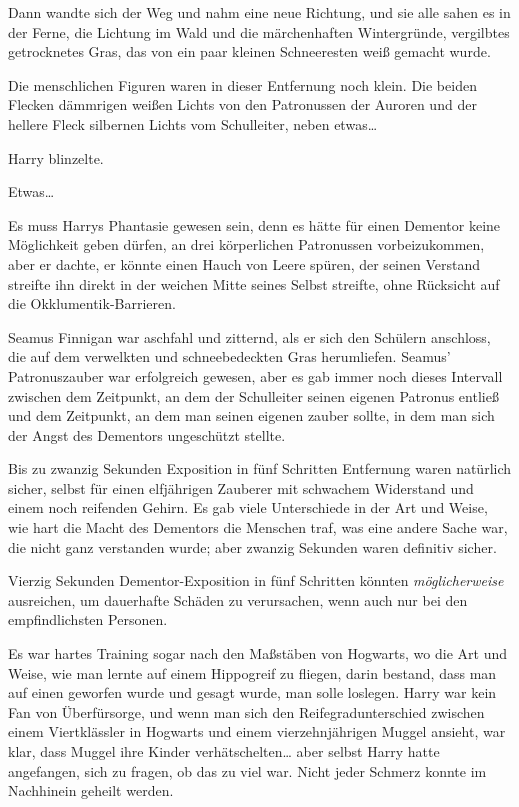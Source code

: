 {Dann wandte sich der Weg und nahm eine neue Richtung, und sie alle sahen es in der Ferne, die Lichtung im Wald und die märchenhaften Wintergründe, vergilbtes getrocknetes Gras, das von ein paar kleinen Schneeresten weiß gemacht wurde.

Die menschlichen Figuren waren in dieser Entfernung noch klein. Die beiden Flecken dämmrigen weißen Lichts von den Patronussen der Auroren und der hellere Fleck silbernen Lichts vom Schulleiter, neben etwas…

Harry blinzelte.

Etwas…

Es muss Harrys Phantasie gewesen sein, denn es hätte für einen Dementor keine Möglichkeit geben dürfen, an drei körperlichen Patronussen vorbeizukommen, aber er dachte, er könnte einen Hauch von Leere spüren, der seinen Verstand streifte ihn direkt in der weichen Mitte seines Selbst streifte, ohne Rücksicht auf die Okklumentik-Barrieren.

Seamus Finnigan war aschfahl und zitternd, als er sich den Schülern anschloss, die auf dem verwelkten und schneebedeckten Gras herumliefen. Seamus' Patronuszauber war erfolgreich gewesen, aber es gab immer noch dieses Intervall zwischen dem Zeitpunkt, an dem der Schulleiter seinen eigenen Patronus entließ und dem Zeitpunkt, an dem man seinen eigenen zauber sollte, in dem man sich der Angst des Dementors ungeschützt stellte.

Bis zu zwanzig Sekunden Exposition in fünf Schritten Entfernung waren natürlich sicher, selbst für einen elfjährigen Zauberer mit schwachem Widerstand und einem noch reifenden Gehirn. Es gab viele Unterschiede in der Art und Weise, wie hart die Macht des Dementors die Menschen traf, was eine andere Sache war, die nicht ganz verstanden wurde; aber zwanzig Sekunden waren definitiv sicher.

Vierzig Sekunden Dementor-Exposition in fünf Schritten könnten \emph{möglicherweise} ausreichen, um dauerhafte Schäden zu verursachen, wenn auch nur bei den empfindlichsten Personen.

Es war hartes Training sogar nach den Maßstäben von Hogwarts, wo die Art und Weise, wie man lernte auf einem Hippogreif zu fliegen, darin bestand, dass man auf einen geworfen wurde und gesagt wurde, man solle loslegen. Harry war kein Fan von Überfürsorge, und wenn man sich den Reifegradunterschied zwischen einem Viertklässler in Hogwarts und einem vierzehnjährigen Muggel ansieht, war klar, dass Muggel ihre Kinder verhätschelten… aber selbst Harry hatte angefangen, sich zu fragen, ob das zu viel war. Nicht jeder Schmerz konnte im Nachhinein geheilt werden.

}
